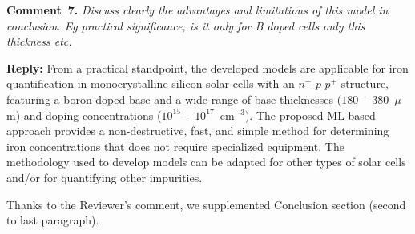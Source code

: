 \documentclass[a4paper,fleqn]{cas-sc}
\begin{document}
%
%
%




\vspace{1cm}
\noindent
\textcolor[rgb]{0.00,0.50,1.00}{\textbf{Comment~7.}}
\emph{Discuss clearly the advantages and limitations of this model in conclusion. Eg practical significance, is it only for B doped cells only this thickness etc.}

\noindent
\textcolor[rgb]{0.51,0.00,0.00}{\textbf{Reply:}}
From a practical standpoint, the developed models are applicable for iron quantification 
in monocrystalline silicon solar cells with an $n^+$-$p$-$p^+$ structure, 
featuring a boron-doped base and a wide range of base thicknesses ($180-380$~$\mu$m) 
and doping concentrations ($10^{15}-10^{17}$~cm$^{-3}$). 
The proposed ML-based approach provides a non-destructive, fast, and simple method 
for determining iron concentrations that does not require specialized equipment. 
The methodology used to develop models can be adapted for other types of solar cells 
and/or for quantifying other impurities.

Thanks to the Reviewer's comment, we supplemented Conclusion section (second to last paragraph).


%



\end{document}
